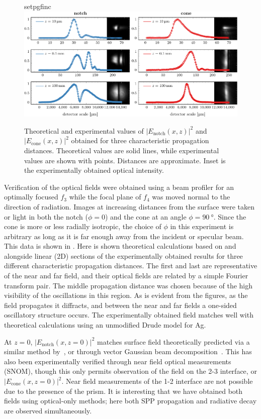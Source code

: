 \begin{figure}[ht]
 \centering
 {setpgfinc}
	\includegraphics{interference/figures/fig2-crop.pdf}
	\caption{ Theoretical and experimental values of
$|E_\text{notch}(x,z)|^2$ and $|E_\text{cone}(x,z)|^2$ obtained for three
characteristic propagation distances.  Theoretical values are solid lines,
while experimental values are shown with points.  Distances are
approximate.  Inset is the experimentally obtained optical intensity.}
 \label{fig:fresnelprop}
\end{figure}
Verification of the optical fields were obtained using a beam profiler for
an optimally focused $f_3$ while the focal plane of $f_4$ was moved normal
to the direction of radiation.  Images at increasing distances from the
surface were taken or light in both the notch
($\phi=0$) and the cone at an angle $\phi = \SI{90}{\degree}$.  Since the
cone is more or less radially isotropic, the choice of $\phi$ in this
experiment is arbitrary as long as it is far enough away from the incident
or specular beam.  This data is shown in .  Here is
shown theoretical calculations based on  and
 alongside linear (2D) sections of the experimentally obtained results for
three different characteristic propagation distances.  The first and last
are representative of the near and far field, and their optical fields are
related by a simple Fourier transform pair.  The middle propagation
distance was chosen because of the high visibility of the oscillations in
this region.  As is evident from the figures, as the field propagates it
diffracts, and between the near and far fields a one-sided oscillatory
structure occurs.  The experimentally obtained field matches well with
theoretical calculations using an unmodified Drude model for Ag.

At $z=0$, $|E_\text{notch}(x,z=0)|^2$ matches surface field theoretically
predicted via a similar method by~\cite{chuang1986lateral}, or through
vector Gaussian beam decomposition~\cite{baida1999theoretical}.  This has
also been experimentally verified through near field optical measurements
(SNOM), though this only permits observation of the field on the 2-3
interface, or $|E_\text{cone}(x,z=0)|^2$.  Near field measurements of the
1-2 interface are not possible due to the presence of the prism.  It is
interesting that we have obtained both fields using optical-only methods;
here both SPP propagation and radiative decay are observed simultaneously.

